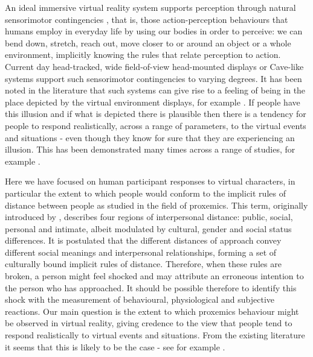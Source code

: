 \documentclass[
		twoside,openright,titlepage,numbers=noenddot,manychapters,
		headinclude,%
                footinclude=false,cleardoublepage=empty,
                BCOR=5mm,
		fontsize=11pt, %
                 enabledeprecatedfontcommands]{scrreprt}
\begin{document}
An ideal immersive virtual reality system supports perception through natural sensorimotor contingencies \cite[]{noe2004action}, that is, those action-perception behaviours that humans employ in everyday life by  using our bodies in order to perceive: we can bend down, stretch, reach out, move closer to or around an object or a whole environment, implicitly knowing the rules that relate perception to action. Current day head-tracked, wide field-of-view head-mounted displays or Cave-like systems \cite[]{cruz1993surround} support such sensorimotor contingencies to varying degrees. It has been noted in the literature that such systems can give rise to a feeling of being in the place depicted by the virtual environment displays, for example \cite[]{draper1998telepresence,  sanchez2005presence, sheridan1992musings, sheridan1996further, slater2009}. If people have this illusion and if what is depicted there is plausible then there is a tendency for people to respond realistically, across a range of parameters, to the virtual events and situations - even though they know for sure that they are experiencing an illusion. This has been demonstrated many times across a range of studies, for example \cite{bideau2003real, pertaub2002experiment, slater2006virtual}.

Here we have focused on human participant responses to virtual characters, in particular the extent to which people would conform to the implicit rules of distance between people as studied in the field of proxemics. This term, originally introduced by \cite{hall1963system,hall1969hdm}, describes four regions of interpersonal distance: public, social, personal and intimate, albeit modulated by cultural, gender and social status differences.  It is postulated that the different distances of approach convey different social meanings and interpersonal relationships, forming a set of culturally bound implicit rules of distance. Therefore, when these rules are broken, a person might feel shocked and may attribute an erroneous intention to the person who has approached. It should be possible therefore to identify this shock with the measurement of behavioural, physiological and subjective reactions. Our main question is the extent to which proxemics behaviour might be observed in virtual reality, giving credence to the view that people tend to respond realistically to virtual events and situations. From the existing literature it seems that this is likely to be the case - see for example \cite{bailenson2003idi, bailenson2001etr} \cite{blas2002, blascovich2002social} \cite{friedman2007spatial,guye1999nonverbal,wilcox2006personal}. 
\end{document}
